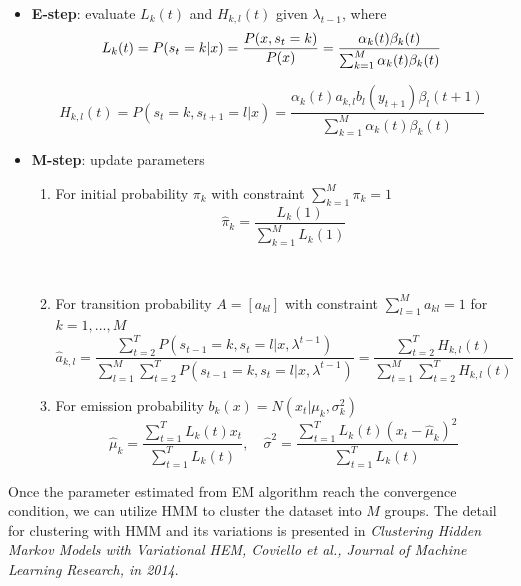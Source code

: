 \documentclass[a4paper]{article}
\begin{document}
\begin{itemize}
	\item \textbf{E-step}: evaluate $L_k(t)$ and $H_{k,l} (t)$ given $\lambda_{t-1}$, where
	\begin{equation}
		L_k(t) = P(s_t = k | x) = \frac{P(x, s_t = k )}{P(x)} =\frac{\alpha_k(t) \beta_k(t)}{\sum_{k=1}^{M} \alpha_k (t) \beta_k (t)} \\
	\end{equation}
	
	\begin{equation}
		H_{k,l} (t) = P(s_t=k, s_{t+1} = l | x) =\frac{\alpha_k (t) a_{k, l} b_l(y_{t+1}) \beta_l (t+1)}{\sum_{k=1}^{M} \alpha_k (t) \beta_k (t)}
	\end{equation}
	
	\item \textbf{M-step}: update parameters
		\begin{enumerate}
			\item For initial probability $\pi_k$ with constraint $\sum_{k=1}^{M} \pi_k = 1$
			\begin{equation}
				\hat{\pi}_k = \frac{L_k (1)}{\sum_{k=1}^{M} L_k(1)}
			\end{equation}
			
			\
			
			\item For transition probability $A = [a_{kl}]$ with constraint $\sum_{l=1}^{M} a_{kl} = 1$ for $k = 1, ..., M$
			\begin{equation}
				\hat{a}_{k,l} = \frac{\sum_{t=2}^{T} P(s_{t-1} = k, s_t = l | x, \lambda^{t-1})}{\sum_{l=1}^{M} \sum_{t=2}^{T} P(s_{t-1} = k , s_t = l | x, \lambda^{t-1})}  = \frac{\sum_{t=2}^{T} H_{k,l}(t)}{\sum_{t=1}^{M} \sum_{t=2}^{T} H_{k,l} (t)}
			\end{equation}
			
			
			\item For emission probability $b_{k}(x) = N(x_t | \mu_k, \sigma_k^2)$
			\begin{equation}
				\hat{\mu}_k = \frac{\sum_{t=1}^{T} L_k(t) x_t}{\sum_{t=1}^{T} L_k(t)}, \quad \hat{\sigma}^2 = \frac{\sum_{t=1}^{T} L_k(t) (x_t - \hat{\mu}_k)^2}{\sum_{t=1}^{T} L_k(t)}
			\end{equation}
		\end{enumerate}
\end{itemize}

Once the parameter estimated from EM algorithm reach the convergence condition, we can utilize HMM to cluster the dataset into $M$ groups. The detail for clustering with HMM and its variations is presented in \textit{Clustering Hidden Markov Models with Variational HEM, Coviello et al., Journal of Machine Learning Research, in 2014}. 
\end{document}
